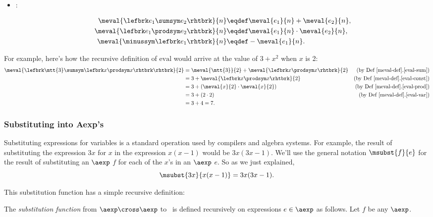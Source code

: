 \begin{definition}
\begin{definition}
\begin{itemize}
\item {}:

\begin{align}
\meval{\lefbrk e_1 \sumsym e_2 \rhtbrk}{n}
   & \eqdef \meval{e_1}{n}+\meval{e_2}{n},\label{eval-sum}\\
\meval{\lefbrk e_1 \prodsym e_2 \rhtbrk}{n}
  & \eqdef \meval{e_1}{n} \cdot \meval{e_2}{n}, \label{eval-prod}\\
\meval{\minussym\lefbrk e_1 \rhtbrk}{n} 
  &  \eqdef - \meval{e_1}{n}. \label{eval-minus}
\end{align}
\end{itemize}

\end{definition}

For example, here's how the recursive definition of $\text{eval}$
would arrive at the value of $3+x^2$ when $x$ is 2:
\begin{align*}
\meval{\lefbrk \mtt{3} \sumsym \lefbrk x \prodsym x\rhtbrk \rhtbrk}{2}
 & = \meval{\mtt{3}}{2} + \meval{\lefbrk x \prodsym x \rhtbrk}{2}
                  & \text{(by~Def~\ref{meval-def}.\ref{eval-sum})}\\
 & = 3 + \meval{\lefbrk x \prodsym x \rhtbrk}{2} & \text{(by~Def~\ref{meval-def}.\ref{eval-const})}\\
 & = 3 + (\meval{x}{2} \cdot \meval{x}{2}) & \text{(by~Def~\ref{meval-def}.\ref{eval-prod})}\\
 & = 3 + (2 \cdot 2) & \text{(by~Def~\ref{meval-def}.\ref{eval-var})}\\
 & = 3 + 4 = 7.
\end{align*}

\subsubsection{Substituting into Aexp's}
Substituting expressions for variables is a standard operation used by
compilers and algebra systems.  For example, the result of substituting
the expression $3x$ for $x$ in the expression $x(x-1)$ would be
$3x(3x-1)$.  We'll use the general notation $\msubst{f}{e}$ for the result
of substituting an $\aexp$ $f$ for each of the $x$'s in an $\aexp$ $e$.
So as we just explained,
\[
\msubst{3x}{x(x-1)} = 3x(3x-1).
\]

This substitution function has a simple recursive definition:

\begin{definition}\label{subst-def}
  The \emph{substitution function} from $\aexp \cross \aexp$ to \aexp\ is
  defined recursively on expressions $e \in \aexp$ as follows.  Let $f$
  be any $\aexp$.


\end{definition}
\end{definition}
